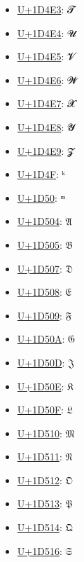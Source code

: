 \begin{itemize}
	\item \href{https://www.compart.com/en/unicode/U+1D4E3}{U+1D4E3}: 𝓣
	\item \href{https://www.compart.com/en/unicode/U+1D4E4}{U+1D4E4}: 𝓤
	\item \href{https://www.compart.com/en/unicode/U+1D4E5}{U+1D4E5}: 𝓥
	\item \href{https://www.compart.com/en/unicode/U+1D4E6}{U+1D4E6}: 𝓦
	\item \href{https://www.compart.com/en/unicode/U+1D4E7}{U+1D4E7}: 𝓧
	\item \href{https://www.compart.com/en/unicode/U+1D4E8}{U+1D4E8}: 𝓨
	\item \href{https://www.compart.com/en/unicode/U+1D4E9}{U+1D4E9}: 𝓩
	\item \href{https://www.compart.com/en/unicode/U+1D4F}{U+1D4F}: ᵏ
	\item \href{https://www.compart.com/en/unicode/U+1D50}{U+1D50}: ᵐ
	\item \href{https://www.compart.com/en/unicode/U+1D504}{U+1D504}: 𝔄
	\item \href{https://www.compart.com/en/unicode/U+1D505}{U+1D505}: 𝔅
	\item \href{https://www.compart.com/en/unicode/U+1D507}{U+1D507}: 𝔇
	\item \href{https://www.compart.com/en/unicode/U+1D508}{U+1D508}: 𝔈
	\item \href{https://www.compart.com/en/unicode/U+1D509}{U+1D509}: 𝔉
	\item \href{https://www.compart.com/en/unicode/U+1D50A}{U+1D50A}: 𝔊
	\item \href{https://www.compart.com/en/unicode/U+1D50D}{U+1D50D}: 𝔍
	\item \href{https://www.compart.com/en/unicode/U+1D50E}{U+1D50E}: 𝔎
	\item \href{https://www.compart.com/en/unicode/U+1D50F}{U+1D50F}: 𝔏
	\item \href{https://www.compart.com/en/unicode/U+1D510}{U+1D510}: 𝔐
	\item \href{https://www.compart.com/en/unicode/U+1D511}{U+1D511}: 𝔑
	\item \href{https://www.compart.com/en/unicode/U+1D512}{U+1D512}: 𝔒
	\item \href{https://www.compart.com/en/unicode/U+1D513}{U+1D513}: 𝔓
	\item \href{https://www.compart.com/en/unicode/U+1D514}{U+1D514}: 𝔔
	\item \href{https://www.compart.com/en/unicode/U+1D516}{U+1D516}: 𝔖

\end{itemize}
